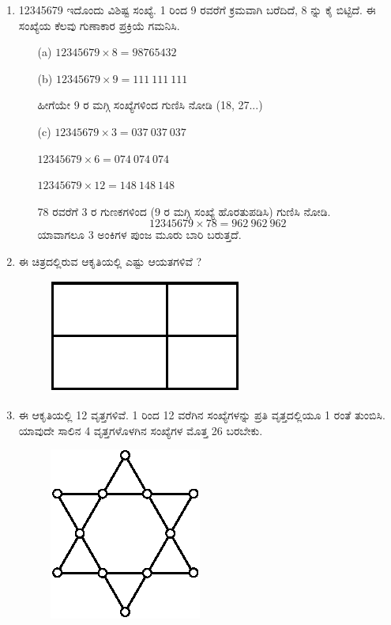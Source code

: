 \begin{enumerate}
\item 12345679 ಇದೊಂದು ವಿಶಿಷ್ಟ ಸಂಖ್ಯೆ. 1 ರಿಂದ 9 ರವರೆಗೆ ಕ್ರಮವಾಗಿ ಬರೆದಿದೆ, 8 ನ್ನು ಕೈ ಬಿಟ್ಟಿದೆ. ಈ ಸಂಖ್ಯೆಯ ಕೆಲವು ಗುಣಾಕಾರ ಪ್ರಕ್ರಿಯೆ ಗಮನಿಸಿ.
\begin{itemize}
\itemsep=4pt
\item[(a)] $12345679\times 8 = 98765432$

\item[(b)] $12345679\times 9 = 111 \ 111 \ 111$

ಹೀಗೆಯೇ 9 ರ ಮಗ್ಗಿ ಸಂಖ್ಯೆಗಳಿಂದ ಗುಣಿಸಿ ನೋಡಿ (18, 27...)

\item[(c)] $12345679\times 3 = 037 \ 037 \ 037$


$12345679 \times 6 = 074 \ 074 \ 074$


$12345679 \times 12 = 148 \ 148 \ 148$


78 ರವರೆಗೆ 3 ರ ಗುಣಕಗಳಿಂದ (9 ರ ಮಗ್ಗಿ ಸಂಖ್ಯೆ ಹೊರತುಪಡಿಸಿ) ಗುಣಿಸಿ ನೋಡಿ.
$$
12345679\times 78 = 962 \ 962 \ 962
$$ 
ಯಾವಾಗಲೂ 3 ಅಂಕಿಗಳ ಪುಂಜ ಮೂರು ಬಾರಿ ಬರುತ್ತದೆ.
\end{itemize}

\item ಈ ಚಿತ್ರದಲ್ಲಿರುವ ಆಕೃತಿಯಲ್ಲಿ ಎಷ್ಟು ಆಯತಗಳಿವೆ ?
\begin{figure}[!ht]
\centering
\includegraphics[scale=1.3]{images/chap1/q16.eps}
\end{figure}

\eject

\item ಈ ಆಕೃತಿಯಲ್ಲಿ 12 ವೃತ್ತಗಳಿವೆ. 1 ರಿಂದ 12 ವರೆಗಿನ ಸಂಖ್ಯೆಗಳನ್ನು ಪ್ರತಿ ವೃತ್ತದಲ್ಲಿಯೂ 1 ರಂತೆ ತುಂಬಿಸಿ. ಯಾವುದೇ ಸಾಲಿನ 4 ವೃತ್ತಗಳೊಳಗಿನ ಸಂಖ್ಯೆಗಳ ಮೊತ್ತ 26 ಬರಬೇಕು.
\begin{figure}[!ht]
\centering
\includegraphics[scale=.8]{images/chap1/q17.eps}
\end{figure}


\end{enumerate}

